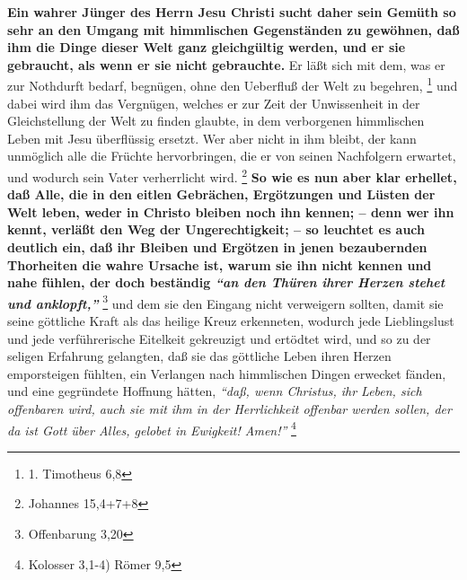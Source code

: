 \textbf{Ein wahrer Jünger des Herrn Jesu Christi sucht daher sein Gemüth so sehr an den
Umgang mit himmlischen Gegenständen zu gewöhnen, daß ihm die Dinge dieser Welt
ganz gleichgültig werden, und er sie gebraucht, als wenn er sie nicht
gebrauchte.} Er läßt sich mit dem, was er zur Nothdurft bedarf, begnügen, ohne
den Ueberfluß der Welt zu begehren,
\footnote{1. Timotheus 6,8}
und dabei wird ihm das
Vergnügen, welches er zur Zeit der Unwissenheit in der Gleichstellung der Welt
zu finden glaubte, in dem verborgenen himmlischen Leben mit Jesu überflüssig
ersetzt. Wer aber nicht in ihm bleibt, der kann unmöglich alle die Früchte
hervorbringen, die er von seinen Nachfolgern erwartet, und wodurch sein Vater
verherrlicht wird.
\footnote{Johannes 15,4+7+8}
\textbf{So wie es nun aber klar erhellet,
daß Alle, die in den eitlen Gebrächen, Ergötzungen und Lüsten der Welt leben,
weder in Christo bleiben noch ihn kennen; -- denn wer ihn kennt, verläßt den Weg
der Ungerechtigkeit; -- so leuchtet es auch deutlich ein, daß ihr Bleiben und
Ergötzen in jenen bezaubernden Thorheiten die wahre Ursache ist, warum sie ihn
nicht kennen und nahe fühlen, der doch beständig
\textit{"`an den Thüren ihrer Herzen
stehet und anklopft,"'}}
\footnote{Offenbarung 3,20}
und dem sie den Eingang nicht
verweigern sollten, damit sie seine göttliche Kraft als das heilige Kreuz
erkenneten, wodurch jede Lieblingslust und jede verführerische Eitelkeit
gekreuzigt und ertödtet wird, und so zu der seligen Erfahrung gelangten, daß sie
das göttliche Leben ihren Herzen emporsteigen fühlten, ein Verlangen nach
himmlischen Dingen erwecket fänden, und eine gegründete Hoffnung hätten,
\textit{"`daß,
wenn Christus, ihr Leben, sich offenbaren wird, auch sie mit ihm in der
Herrlichkeit offenbar werden sollen, der da ist Gott über Alles, gelobet in
Ewigkeit! Amen!"'}
\footnote{Kolosser 3,1-4) Römer 9,5}
